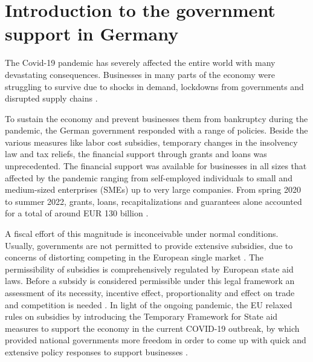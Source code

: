 
\chapter{Introduction to the government support in Germany} %

\label{Chapter1} %




The Covid-19 pandemic has severely affected the entire world with many devastating consequences. Businesses in many parts of the economy were struggling to survive due to shocks in demand, lockdowns from governments and disrupted supply chains \parencite{eu_com_temporary_2020}.

To sustain the economy and prevent businesses them from bankruptcy during the pandemic, the German government responded with a range of policies. Beside the various measures like labor cost subsidies, temporary changes in the insolvency law and tax reliefs, the financial support through grants and loans was unprecedented. The financial support was available for businesses in all sizes that affected by the pandemic ranging from self-employed individuals to small and medium-sized enterprises (SMEs) up to very large companies. From spring 2020 to summer 2022, grants, loans, recapitalizations and guarantees alone accounted for a total of around EUR 130 billion \parencite{bmwk_uberblickspapier_2022}. 


A fiscal effort of this magnitude is inconceivable under normal conditions. Usually, governments are not permitted to provide extensive subsidies, due to concerns of distorting competing in the European single market \parencite{claici_european_2022}. The permissibility of subsidies is comprehensively regulated by European state aid laws. Before a subsidy is considered permissible under this legal framework an assessment of its necessity, incentive effect, proportionality and effect on trade and competition is needed \parencite{claici_european_2022}. In light of the ongoing pandemic, the EU relaxed rules on subsidies by introducing the Temporary Framework for State aid measures to support the economy in the current COVID-19 outbreak, by which provided national governments more freedom in order to come up with quick and extensive policy responses to support businesses \parencite{eu_com_temporary_2020}.

